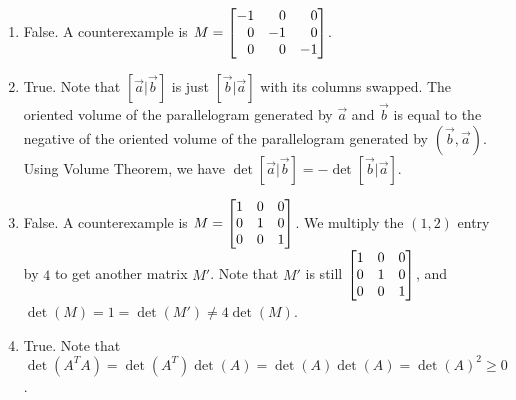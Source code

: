 \begin{exercises}
\begin{problist}
\begin{solution}
\begin{enumerate}
				\item False. A counterexample is
					$M=\mat{-1 & 0 & 0 \\ 0 & -1 & 0 \\ 0 & 0 & -1}$.

				\item True. Note that $[\vec a|\vec b]$ is just
					$[\vec b|\vec a]$ with its columns swapped. The oriented volume
					of the parallelogram generated by $\vec a$ and $\vec b$ is equal
					to the negative of the oriented volume of the parallelogram generated
					by $(\vec b,\vec a)$. Using Volume Theorem, we have $\det[\vec
					a|\vec b]=-\det[\vec b|\vec a]$.

				\item False. A counterexample is
					$M=\mat{1 & 0 & 0 \\ 0 & 1 & 0 \\ 0 & 0 & 1}$. We multiply the
					$(1,2)$ entry by $4$ to get another matrix $M'$. Note that
					$M'$ is still $\mat{1 & 0 & 0 \\ 0 & 1 & 0 \\ 0 & 0 & 1 }$, and
					$\det(M)=1=\det(M')\ne 4\det(M)$.

				\item True. Note that
					$\det(A^{T}A)=\det(A^{T})\det(A)=\det(A)\det(A)=\det(A)^{2}\ge
					0$.
			\end{enumerate}
		\end{solution}
	\end{problist}
\end{exercises}